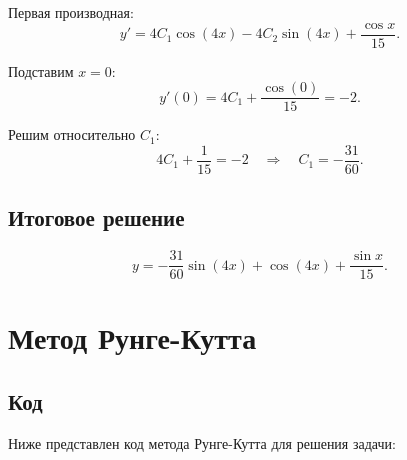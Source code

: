\documentclass[a4paper,12pt]{article}
\begin{document}
Первая производная:
\[
y' = 4C_1 \cos(4x) - 4C_2 \sin(4x) + \frac{\cos x}{15}.
\]

Подставим \(x = 0\):
\[
y'(0) = 4C_1 + \frac{\cos(0)}{15} = -2.
\]

Решим относительно \(C_1\):
\[
4C_1 + \frac{1}{15} = -2 \quad \Rightarrow \quad C_1 = -\frac{31}{60}.
\]

\subsection*{Итоговое решение}
\[
y = -\frac{31}{60} \sin(4x) + \cos(4x) + \frac{\sin x}{15}.
\]

\section{Метод Рунге-Кутта}

\subsection*{Код}
\par
Ниже представлен код метода Рунге-Кутта для решения задачи:
\end{document}
